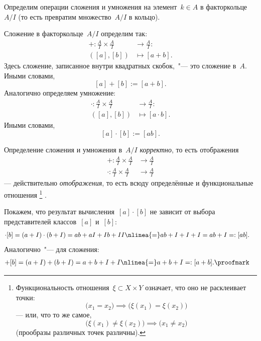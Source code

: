 Определим операции сложения и умножения на элемент~$k \in A$ в факторкольце~$A/I$ (то есть превратим множество~$A/I$  в кольцо).

\begin{definition}
	Сложение в факторкольце~$A/I$ определим так:
	\begin{align*}
		+ \colon
		\frac{A}{I} \times \frac{A}{I} &\to \frac{A}{I}
		\colon
		\\
		([a], [b]) &\mapsto [a + b]
		.
	\end{align*}
	Здесь сложение, записанное внутри квадратных скобок,~"--- это сложение в~$A$. Иными словами,
	\[
		[a] + [b] := [a + b].
	\]
	Аналогично определяем умножение:
	\begin{align*}
		\cdot \colon
		\frac{A}{I} \times \frac{A}{I} &\to \frac{A}{I}
		\colon
		\\
		([a], [b]) &\mapsto [a \cdot b]
		.
	\end{align*}
	Иными словами,
	\[
		[a] \cdot [b] := [ab]
		.
	\]
\end{definition}

\begin{remark}
	Определение сложения и умножения в~$A/I$ \emph{корректно}, то есть отображения
	\begin{align*}
		+ \colon
		\frac{A}{I}
		\times
		\frac{A}{I}
		&\to
		\frac{A}{I}
		\\
		\cdot \colon
		\frac{A}{I}
		\times
		\frac{A}{I}
		&\to
		\frac{A}{I}
	\end{align*}
	--- действительно \emph{отображения}, то есть всюду определённые и функциональные отношения%
	\footnote{%
		Функциональность отношения~$\xi \subset X \times Y$ означает, что оно не расклеивает точки:
		\[
			\bigl( x_1 = x_2 \bigr)
			\implies
			\bigl(
				\xi(x_1) = \xi(x_2)
			\bigr)
		\]
		--- или, что то же самое,
		\[
			\bigl(
				\xi(x_1) \neq \xi(x_2)
			\bigr)
			\implies
			\bigl( x_1 \neq x_2 \bigr)
		\]
		(прообразы различных точек различны).
	}%
	.
\end{remark}
\begin{proofm}
	Покажем, что результат вычисления~$[a] \cdot [b]$ не зависит от выбора представителей классов~$[a]$ и~$[b]$:
	\begin{align*}
		[a] \cdot [b] &=
		(a + I) \cdot (b + I)
		=
		ab + aI + Ib + II
		\nlinea{=}
		ab + I + I + I
		=
		ab + I
		=:
		[ab]
		.
	\end{align*}
	Аналогично~"--- для сложения:
	\begin{align*}
		[a] + [b] &=
		(a + I) + (b + I)
		=
		a + b + I + I
		\nlinea{=}
		a + b + I
		=:
		[a+b]
		.
		\proofmark
	\end{align*}
\end{proofm}



